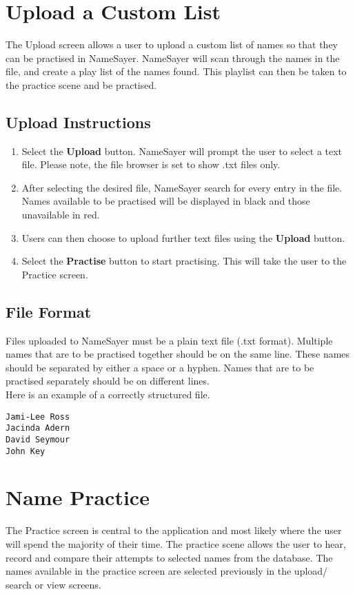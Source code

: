\documentclass{article}
\begin{document}
\section{Upload a Custom List}
The Upload screen allows a user to upload a custom list of names so that they can be practised in NameSayer. 
NameSayer will scan through the names in the file, and create a play list of the names found. This playlist can then be taken to the practice scene and be practised.

\subsection{Upload Instructions}

\begin{enumerate}
	\item Select the \textbf{Upload} button. NameSayer will prompt the user to select a text file. Please note, the file browser is set to show .txt files only.

	\item After selecting the desired file, NameSayer search for every entry in the file. Names available to be practised will be displayed in black and those unavailable in red. 

	\item Users can then choose to upload further text files using the \textbf{Upload} button.

	\item Select the \textbf{Practise} button to start practising. This will take the user to the Practice screen.

\end{enumerate}

\subsection{File Format}
Files uploaded to NameSayer must be a plain text file (.txt format). 
Multiple names that are to be practised together should be on the 
same line. These names should be separated by either a space or a hyphen. Names that are to be practised separately should be on different lines. \\

Here is an example of a correctly structured file.
\begin{verbatim}
Jami-Lee Ross
Jacinda Adern
David Seymour
John Key
\end{verbatim}

\section{Name Practice}
The Practice screen is central to the application and most likely where the user will spend the majority of their time. The practice
scene allows the user to hear, record and compare their attempts to selected names from the database. The names available 
in the practice screen are selected previously in the upload/ search or view screens. 
\end{document}
